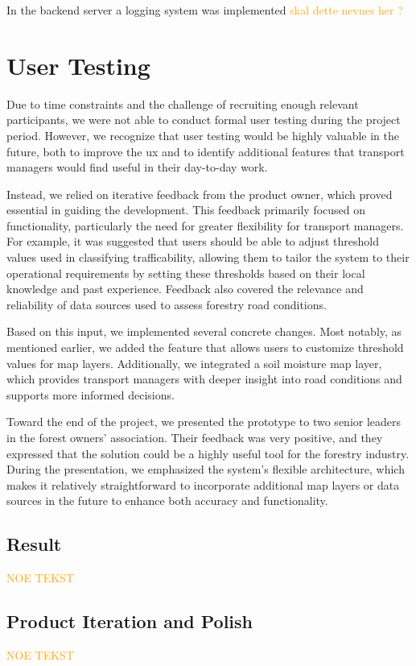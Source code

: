 In the backend server a logging system was implemented \textcolor{orange}{skal dette nevnes her ?}

\section{User Testing}\label{sec:quality_assurance_user_feedback:user_testing}

Due to time constraints and the challenge of recruiting enough relevant participants, we were not able to conduct formal user testing during the project period. However, we recognize that user testing would be highly valuable in the future, both to improve the \acrfull{ux} and to identify additional features that transport managers would find useful in their day-to-day work.

Instead, we relied on iterative feedback from the product owner, which proved essential in guiding the development. This feedback primarily focused on functionality, particularly the need for greater flexibility for transport managers. For example, it was suggested that users should be able to adjust threshold values used in classifying trafficability, allowing them to tailor the system to their operational requirements by setting these thresholds based on their local knowledge and past experience. Feedback also covered the relevance and reliability of data sources used to assess forestry road conditions.

Based on this input, we implemented several concrete changes. Most notably, as mentioned earlier, we added the feature that allows users to customize threshold values for map layers. Additionally, we integrated a soil moisture map layer, which provides transport managers with deeper insight into road conditions and supports more informed decisions.

Toward the end of the project, we presented the prototype to two senior leaders in the forest owners’ association. Their feedback was very positive, and they expressed that the solution could be a highly useful tool for the forestry industry. During the presentation, we emphasized the system’s flexible architecture, which makes it relatively straightforward to incorporate additional map layers or data sources in the future to enhance both accuracy and functionality.

\subsection{Result}

\textcolor{orange}{NOE TEKST}

\subsection{Product Iteration and Polish}

\textcolor{orange}{NOE TEKST}
